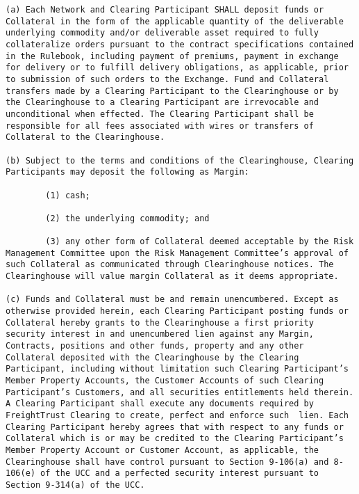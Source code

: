 \documentclass[12pt]{article}
\begin{document}
\begin{verbatim}
(a) Each Network and Clearing Participant SHALL deposit funds or Collateral in the form of the applicable quantity of the deliverable underlying commodity and/or deliverable asset required to fully collateralize orders pursuant to the contract specifications contained in the Rulebook, including payment of premiums, payment in exchange for delivery or to fulfill delivery obligations, as applicable, prior to submission of such orders to the Exchange. Fund and Collateral transfers made by a Clearing Participant to the Clearinghouse or by the Clearinghouse to a Clearing Participant are irrevocable and unconditional when effected. The Clearing Participant shall be responsible for all fees associated with wires or transfers of Collateral to the Clearinghouse.

(b) Subject to the terms and conditions of the Clearinghouse, Clearing Participants may deposit the following as Margin:

        (1) cash;

        (2) the underlying commodity; and

        (3) any other form of Collateral deemed acceptable by the Risk Management Committee upon the Risk Management Committee’s approval of such Collateral as communicated through Clearinghouse notices. The Clearinghouse will value margin Collateral as it deems appropriate.

(c) Funds and Collateral must be and remain unencumbered. Except as otherwise provided herein, each Clearing Participant posting funds or Collateral hereby grants to the Clearinghouse a first priority security interest in and unencumbered lien against any Margin, Contracts, positions and other funds, property and any other Collateral deposited with the Clearinghouse by the Clearing Participant, including without limitation such Clearing Participant’s Member Property Accounts, the Customer Accounts of such Clearing Participant’s Customers, and all securities entitlements held therein. A Clearing Participant shall execute any documents required by FreightTrust Clearing to create, perfect and enforce such  lien. Each Clearing Participant hereby agrees that with respect to any funds or Collateral which is or may be credited to the Clearing Participant’s Member Property Account or Customer Account, as applicable, the Clearinghouse shall have control pursuant to Section 9-106(a) and 8-106(e) of the UCC and a perfected security interest pursuant to Section 9-314(a) of the UCC.


\end{verbatim}
\end{document}
